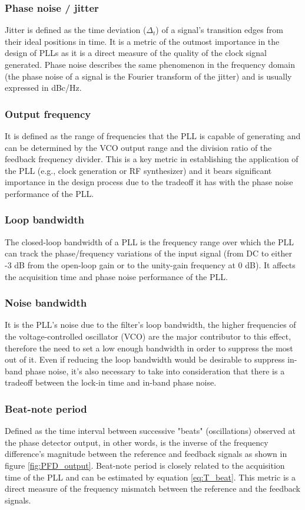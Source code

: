 \subsubsection{Phase noise / jitter}
Jitter is defined as the time deviation ($\Delta_t$) of a signal's transition edges from their ideal positions in time. It is a metric of the outmost importance in the design of PLLs 
as it is a direct measure of the quality of the clock signal generated. Phase noise describes the same phenomenon in the frequency domain (the phase noise of a signal is the Fourier 
transform of the jitter) and is usually expressed in dBc/Hz.
\subsubsection{Output frequency}
It is defined as the range of frequencies that the PLL is capable of generating and can be determined by the VCO output range and the division ratio of the feedback frequency divider. This
is a key metric in establishing the application of the PLL (e.g., clock generation or RF synthesizer) and it bears significant importance in the design process due to the tradeoff 
it has with the phase noise performance of the PLL.
\subsubsection{Loop bandwidth}
The closed-loop bandwidth of a PLL is the frequency range over which the PLL can track the phase/frequency variations of the input signal 
(from DC to either -3 dB from the open-loop gain or to the unity-gain frequency at 0 dB). It affects the acquisition time and phase noise 
performance of the PLL.
\subsubsection{Noise bandwidth}
It is the PLL's noise due to the filter's loop bandwidth, the higher frequencies of the voltage-controlled oscillator (VCO) are the major
contributor to this effect, therefore the need to set a low enough bandwidth in order to suppress the most out of it. Even if reducing the loop
bandwidth would be desirable to suppress in-band phase noise, it's also necessary to take into consideration that there is a tradeoff between the
lock-in time and in-band phase noise.
\subsubsection{Beat-note period}
Defined as the time interval between successive "beats" (oscillations) observed at the phase detector output, in other words, is the inverse of
the frequency difference's magnitude between the reference and feedback signals as shown in figure \ref{fig:PFD_output}. Beat-note period is closely related to the acquisition time of the
PLL and can be estimated by equation \eqref{eq:T_beat}. This metric is a direct measure of the frequency mismatch between the reference and
the feedback signals.

